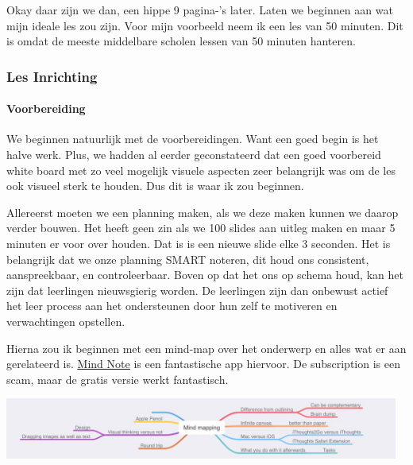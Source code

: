 \documentclass{article}
\begin{document}
            Okay daar zijn we dan, een hippe 9 pagina-'s later. Laten we beginnen aan wat mijn ideale les zou zijn. Voor mijn voorbeeld neem ik een les van 50 minuten. Dit is omdat de meeste middelbare scholen lessen van 50 minuten hanteren. 
            
            \subsubsection{Les Inrichting}
                
                \bigskip\noindent\paragraph{Voorbereiding}
                    
                    We beginnen natuurlijk met de voorbereidingen. Want een goed begin is het halve werk. Plus, we hadden al eerder geconstateerd dat een goed voorbereid white board met zo veel mogelijk visuele aspecten zeer belangrijk was om de les ook visueel sterk te houden. Dus dit is waar ik zou beginnen. 

                    Allereerst moeten we een planning maken, als we deze maken kunnen we daarop verder bouwen. Het heeft geen zin als we 100 slides aan uitleg maken en maar 5 minuten er voor over houden. Dat is is een nieuwe slide elke 3 seconden. Het is belangrijk dat we onze planning SMART noteren, dit houd ons consistent, aanspreekbaar, en controleerbaar. Boven op dat het ons op schema houd, kan het zijn dat leerlingen nieuwsgierig worden. De leerlingen zijn dan onbewust actief het leer process aan het ondersteunen door hun zelf te motiveren en verwachtingen opstellen.\cite{NAME-ME}

                    Hierna zou ik beginnen met een mind-map over het onderwerp en alles wat er aan gerelateerd is. \hyperlink{https://www.mindnode.com}{\underline{Mind Note}} is een fantastische app hiervoor. De subscription is een scam, maar de gratis versie werkt fantastisch. 
                    
                    \begin{center}
                        \includegraphics[width=35em]{mind-note.jpg}
                    \end{center}
\end{document}
